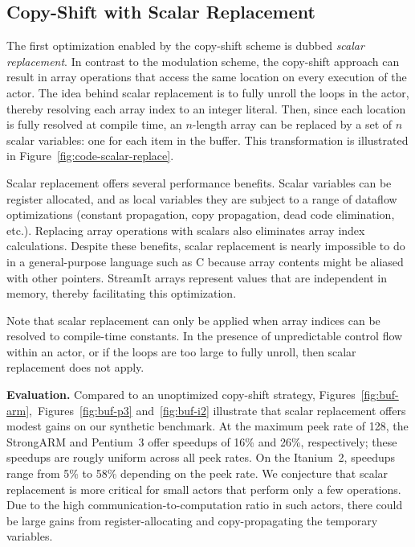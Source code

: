 \subsection{Copy-Shift with Scalar Replacement}
\label{sec:scalar-replacement}

The first optimization enabled by the copy-shift scheme is dubbed {\it
scalar replacement}.  In contrast to the modulation scheme, the
copy-shift approach can result in array operations that access the
same location on every execution of the actor.  The idea behind
scalar replacement is to fully unroll the loops in the actor, thereby
resolving each array index to an integer literal.  Then, since each
location is fully resolved at compile time, an $n$-length array can be
replaced by a set of $n$ scalar variables: one for each item in the
buffer.  This transformation is illustrated in
Figure~\ref{fig:code-scalar-replace}.

Scalar replacement offers several performance benefits. Scalar
variables can be register allocated, and as local variables they are
subject to a range of dataflow optimizations (constant propagation,
copy propagation, dead code elimination, etc.).  Replacing array
operations with scalars also eliminates array index calculations.
Despite these benefits, scalar replacement is nearly impossible to do
in a general-purpose language such as C because array contents might
be aliased with other pointers.  StreamIt arrays represent values that
are independent in memory, thereby facilitating this optimization.

Note that scalar replacement can only be applied when array indices
can be resolved to compile-time constants.  In the presence of unpredictable
control flow within an actor, or if the loops are too large to fully unroll,
then scalar replacement does not apply.

{\bf Evaluation.}  Compared to an unoptimized copy-shift strategy,
Figures~\ref{fig:buf-arm},~Figures~\ref{fig:buf-p3}
and~\ref{fig:buf-i2} illustrate that scalar replacement offers
modest gains on our synthetic benchmark.  At the maximum peek rate of
128, the StrongARM and Pentium~3 offer speedups of 16\% and 26\%,
respectively; these speedups are rougly uniform across all peek rates.
On the Itanium~2, speedups range from 5\% to 58\% depending on the
peek rate.  We conjecture that scalar replacement is more critical for
small actors that perform only a few operations.  Due to the high
communication-to-computation ratio in such actors, there could be
large gains from register-allocating and copy-propagating the
temporary variables.

